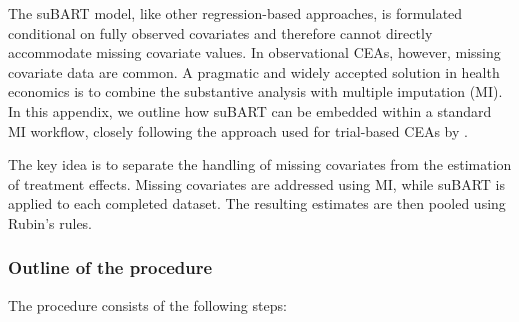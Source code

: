 \documentclass[aoas,preprint]{imsart}
\theoremstyle{plain}
\theoremstyle{definition}
\theoremstyle{remark}
\theoremstyle{remark}
\begin{document}
The suBART model, like other regression-based approaches, is formulated conditional on fully observed covariates and therefore cannot directly accommodate missing covariate values. In observational CEAs, however, missing covariate data are common. A pragmatic and widely accepted solution in health economics is to combine the substantive analysis with multiple imputation (MI). In this appendix, we outline how suBART can be embedded within a standard MI workflow, closely following the approach used for trial-based CEAs by \citet{ben2023conducting}.

The key idea is to separate the handling of missing covariates from the estimation of treatment effects. Missing covariates are addressed using MI, while suBART is applied to each completed dataset. The resulting estimates are then pooled using Rubin’s rules.

\subsubsection{Outline of the procedure}
The procedure consists of the following steps:
\end{document}
